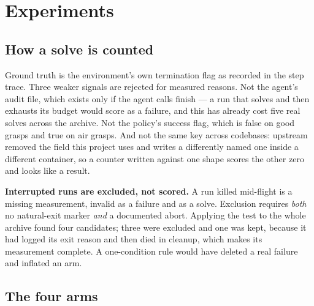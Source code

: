 \documentclass[11pt,a4paper]{report}
\newcommand{\keyrule}[1]{\textbf{\textcolor{acc}{#1}}}
\begin{document}
\chapter{Experiments}
\label{ch:exp}

\section{How a solve is counted}
\label{sec:counting}

Ground truth is the environment's own termination flag as recorded in the step
trace. Three weaker signals are rejected for measured reasons. Not the agent's
audit file, which exists only if the agent calls finish --- a run that solves and
then exhausts its budget would score as a failure, and this has already cost
five real solves across the archive. Not the policy's success flag, which is
false on good grasps and true on air grasps. And not the same key across
codebases: upstream removed the field this project uses and writes a differently
named one inside a different container, so a counter written against one shape
scores the other zero and looks like a result.

\keyrule{Interrupted runs are excluded, not scored.} A run killed mid-flight is a
missing measurement, invalid as a failure and as a solve. Exclusion requires
\emph{both} no natural-exit marker \emph{and} a documented abort. Applying the
test to the whole archive found four candidates; three were excluded and one was
kept, because it had logged its exit reason and then died in cleanup, which
makes its measurement complete. A one-condition rule would have deleted a real
failure and inflated an arm.

\section{The four arms}
\end{document}

